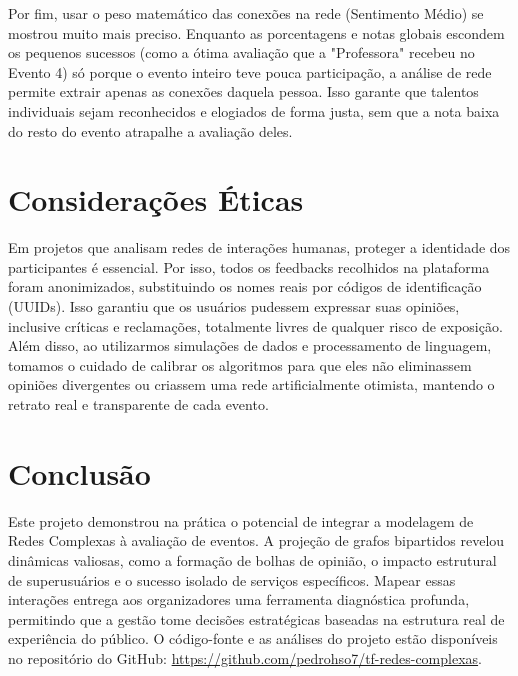 \documentclass[sigconf]{webmedia}
\begin{document}
Por fim, usar o peso matemático das conexões na rede (Sentimento Médio) se mostrou muito mais preciso. Enquanto as porcentagens e notas globais escondem os pequenos sucessos (como a ótima avaliação que a "Professora" recebeu no Evento 4) só porque o evento inteiro teve pouca participação, a análise de rede permite extrair apenas as conexões daquela pessoa. Isso garante que talentos individuais sejam reconhecidos e elogiados de forma justa, sem que a nota baixa do resto do evento atrapalhe a avaliação deles.

\section{Considerações Éticas}
Em projetos que analisam redes de interações humanas, proteger a identidade dos participantes é essencial. Por isso, todos os feedbacks recolhidos na plataforma foram anonimizados, substituindo os nomes reais por códigos de identificação (UUIDs). Isso garantiu que os usuários pudessem expressar suas opiniões, inclusive críticas e reclamações, totalmente livres de qualquer risco de exposição. Além disso, ao utilizarmos simulações de dados e processamento de linguagem, tomamos o cuidado de calibrar os algoritmos para que eles não eliminassem opiniões divergentes ou criassem uma rede artificialmente otimista, mantendo o retrato real e transparente de cada evento.

\section{Conclusão}
Este projeto demonstrou na prática o potencial de integrar a modelagem de Redes Complexas à avaliação de eventos. A projeção de grafos bipartidos revelou dinâmicas valiosas, como a formação de bolhas de opinião, o impacto estrutural de superusuários e o sucesso isolado de serviços específicos. Mapear essas interações entrega aos organizadores uma ferramenta diagnóstica profunda, permitindo que a gestão tome decisões estratégicas baseadas na estrutura real de experiência do público. O código-fonte e as análises do projeto estão disponíveis no repositório do GitHub: \url{https://github.com/pedrohso7/tf-redes-complexas}.



\end{document}
